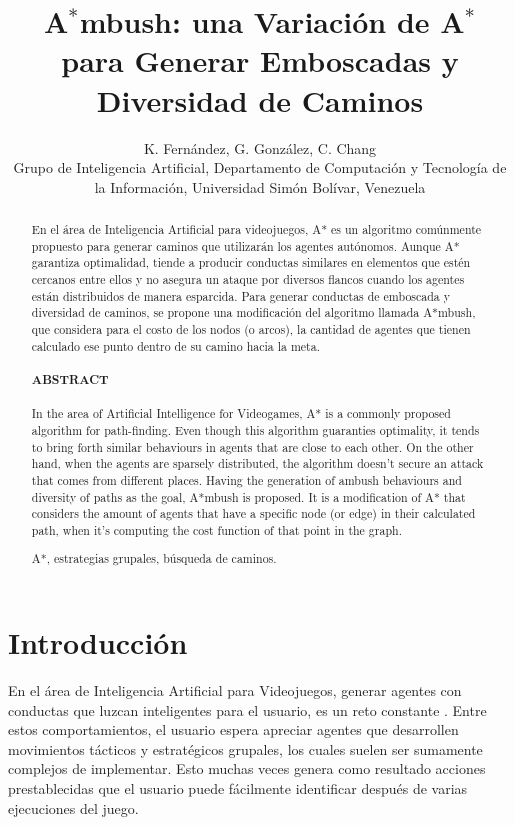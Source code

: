 \documentclass{egpubl}
\title[EG \LaTeX\ Author Guidelines]%
      {A$^*$mbush: una Variación de A$^*$ para Generar Emboscadas y Diversidad de Caminos}
\author[K. Fernández, G. González,  C. Chang]
       {K. Fernández, G. González,  C. Chang
        \\
         Grupo de Inteligencia Artificial, Departamento de Computación y Tecnología de la Información, Universidad Simón Bolívar, Venezuela\\
      }
\begin{document}
\noEGpagenumber

\maketitle

\begin{abstract}
En el área de Inteligencia Artificial para videojuegos, A* es
un algoritmo comúnmente propuesto para generar caminos que 
utilizarán los agentes autónomos. Aunque A* garantiza
optimalidad, tiende a producir conductas similares en elementos que
estén cercanos entre ellos y no asegura un ataque por diversos flancos
cuando los agentes están distribuidos de manera esparcida. Para generar
conductas de emboscada y diversidad de caminos, se propone una modificación 
del algoritmo llamada A*mbush, que considera para el costo de los nodos (o arcos), 
la cantidad de agentes que tienen calculado ese punto dentro de su camino hacia
la meta.  
\\
\\
\textnormal{\textbf{ABSTRACT}}
\\
\\
In the area of Artificial Intelligence for Videogames, A* is a commonly proposed 
algorithm for path-finding. Even though this algorithm guaranties optimality, it 
tends to bring forth similar behaviours in agents that are close to each other. On the
other hand, when the agents are sparsely distributed, the algorithm doesn't secure
an attack that comes from different places. Having the generation of ambush
behaviours and diversity of paths as the goal, A*mbush is proposed. It is a 
modification of A* that considers the amount of agents that have a specific
node (or edge) in their calculated path, when it's computing the cost function of that 
point in the graph.


%
\begin{keywords}
A*, estrategias grupales, búsqueda de caminos.
\end{keywords}

\end{abstract}





\section{Introducción}

En el área de Inteligencia Artificial para Videojuegos, generar
agentes con conductas que luzcan inteligentes para el
usuario, es un reto constante \cite{MF09}. Entre estos comportamientos,
el usuario espera apreciar agentes que desarrollen movimientos
tácticos y estratégicos grupales, los cuales suelen ser sumamente
complejos de implementar. Esto muchas veces genera como resultado
acciones prestablecidas que el usuario puede fácilmente identificar después
de varias ejecuciones del juego.
\end{document}
